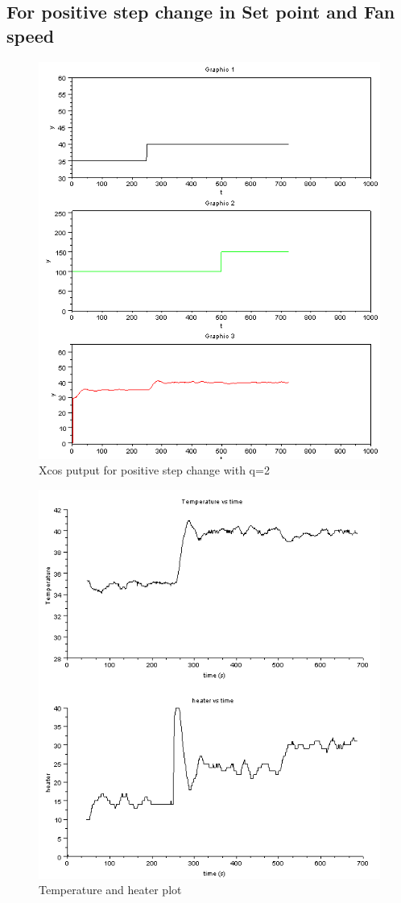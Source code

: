 \subsection{For positive step change in Set point and Fan speed }

\begin{figure}[H]
\centering
  \includegraphics[width=0.8\linewidth]{mpc/3_1.PNG}
  \caption{Xcos putput for positive step change with q=2}
\end{figure}
\begin{figure}[H]
  \includegraphics[width=0.8\linewidth]{mpc/3_1_heater_final.png}
  \caption{Temperature and heater plot}
\end{figure}



